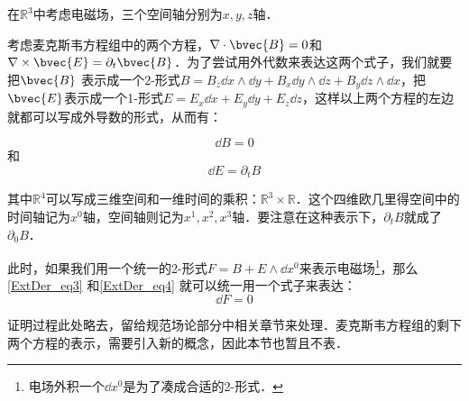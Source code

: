 

在$\mathbb{R}^3$中考虑电磁场，三个空间轴分别为$x, y, z$轴．

考虑麦克斯韦方程组中的两个方程，$\nabla\cdot\bvec{B}=0$和$\nabla\times\bvec{E}=\partial_t\bvec{B}$．为了尝试用外代数来表达这两个式子，我们就要把$\bvec{B}$
表示成一个2-形式$B=B_z\dd x\wedge\dd y+B_x\dd y\wedge\dd z+B_y\dd z\wedge\dd x$，把$\bvec{E}$表示成一个1-形式$E=E_x\dd x+E_y\dd y+E_z\dd z$，这样以上两个方程的左边就都可以写成外导数的形式，从而有：

\begin{equation}\label{ExtDer_eq3}
\dd B=0
\end{equation}
和
\begin{equation}\label{ExtDer_eq4}
\dd E=\partial_tB
\end{equation}

其中$\mathbb{R}^4$可以写成三维空间和一维时间的乘积：$\mathbb{R}^3\times\mathbb{R}$．这个四维欧几里得空间中的时间轴记为$x^0$轴，空间轴则记为$x^1, x^2, x^3$轴．要注意在这种表示下，$\partial_tB$就成了$\partial_0B$．

此时，如果我们用一个统一的2-形式$F=B+E\wedge\dd x^0$来表示电磁场\footnote{电场外积一个$\dd x^0$是为了凑成合适的2-形式．}，那么\autoref{ExtDer_eq3} 和\autoref{ExtDer_eq4} 就可以统一用一个式子来表达：
\begin{equation}
\dd F=0
\end{equation}

证明过程此处略去，留给规范场论部分中相关章节来处理．麦克斯韦方程组的剩下两个方程的表示，需要引入新的概念，因此本节也暂且不表．


